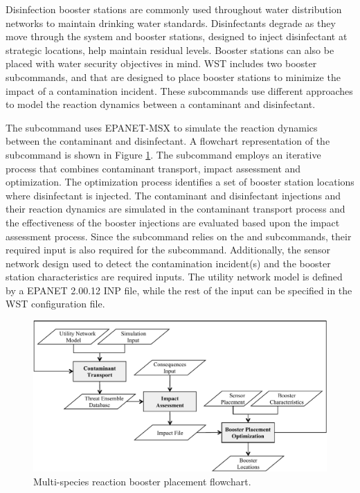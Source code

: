 Disinfection booster stations are commonly used throughout water distribution networks 
to maintain drinking water standards. Disinfectants degrade as they move through the 
system and booster stations, designed to inject disinfectant at strategic locations, 
help maintain residual levels. Booster stations can also be placed with 
water security objectives in mind. WST includes two booster subcommands,  
and  that are 
designed to place booster stations to minimize the impact of a contamination incident. 
These subcommands use different approaches to model the reaction dynamics between 
a contaminant and disinfectant. 

The  subcommand uses EPANET-MSX to 
simulate the reaction dynamics between the contaminant and disinfectant. 
A flowchart representation of the  subcommand is shown 
in Figure \ref{fig:booster_msx_flowchart}. The  subcommand employs 
an iterative process that combines contaminant transport, impact assessment 
and optimization. The optimization process identifies a set of booster station locations 
where disinfectant is injected. The contaminant and disinfectant injections and their 
reaction dynamics are simulated in the contaminant transport 
process and the effectiveness of the booster injections are evaluated based upon 
the impact assessment process. Since the  subcommand relies 
on the  and  subcommands, their required input 
is also required for the  subcommand. Additionally, the sensor network 
design used to detect the contamination incident(s) and the booster station characteristics 
are required inputs. The utility network model is defined by a EPANET 2.00.12 INP file, 
while the rest of the input can be specified in the  WST configuration file.

\begin{figure}[h]
  \centering
  \includegraphics[scale=0.75]{graphics/booster_msx_flowchart.pdf}
  \caption{Multi-species reaction booster placement flowchart.}
  \label{fig:booster_msx_flowchart}
\end{figure}

